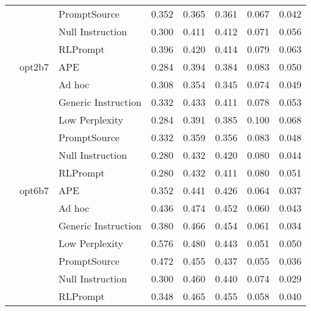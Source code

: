 \begin{supertabular}{lllrrrrr}
              &        & PromptSource &            0.352 &           0.365 &          0.361 &        0.067 &    0.042 \\
              &        & Null Instruction &            0.300 &           0.411 &          0.412 &        0.071 &    0.056 \\
              &        & RLPrompt &            0.396 &           0.420 &          0.414 &        0.079 &    0.063 \\
              & opt2b7 & APE &            0.284 &           0.394 &          0.384 &        0.083 &    0.050 \\
              &        & Ad hoc &            0.308 &           0.354 &          0.345 &        0.074 &    0.049 \\
              &        & Generic Instruction &            0.332 &           0.433 &          0.411 &        0.078 &    0.053 \\
              &        & Low Perplexity &            0.284 &           0.391 &          0.385 &        0.100 &    0.068 \\
              &        & PromptSource &            0.332 &           0.359 &          0.356 &        0.083 &    0.048 \\
              &        & Null Instruction &            0.280 &           0.432 &          0.420 &        0.080 &    0.044 \\
              &        & RLPrompt &            0.280 &           0.432 &          0.411 &        0.080 &    0.051 \\
              & opt6b7 & APE &            0.352 &           0.441 &          0.426 &        0.064 &    0.037 \\
              &        & Ad hoc &            0.436 &           0.474 &          0.452 &        0.060 &    0.043 \\
              &        & Generic Instruction &            0.380 &           0.466 &          0.454 &        0.061 &    0.034 \\
              &        & Low Perplexity &            0.576 &           0.480 &          0.443 &        0.051 &    0.050 \\
              &        & PromptSource &            0.472 &           0.455 &          0.437 &        0.055 &    0.036 \\
              &        & Null Instruction &            0.300 &           0.460 &          0.440 &        0.074 &    0.029 \\
              &        & RLPrompt &            0.348 &           0.465 &          0.455 &        0.058 &    0.040 \\
\end{supertabular}
